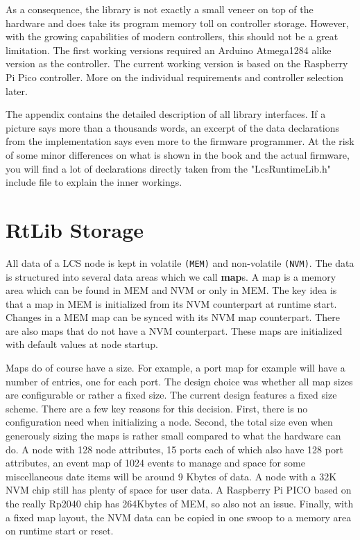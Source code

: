 As a consequence, the library is not exactly a small veneer on top of the hardware and does take its program memory toll on controller storage. However, with the growing capabilities of modern controllers, this should not be a great limitation. The first working versions required an Arduino Atmega1284 alike version as the controller. The current working version is based on the Raspberry Pi Pico controller. More on the individual requirements and controller selection later.

The appendix contains the detailed description of all library interfaces. If a picture says more than a thousands words, an excerpt of the data declarations from the implementation says even more to the firmware programmer. At the risk of some minor differences on what is shown in the book and the actual firmware, you will find a lot of declarations directly taken from the "LcsRuntimeLib.h" include file to explain the inner workings.

\section{RtLib Storage}

All data of a LCS node is kept in volatile \texttt{(MEM)} and non-volatile \texttt{(NVM)}. The data is structured into several data areas which we call \textbf{map}s. A map is a memory area which can be found in MEM and NVM or only in MEM. The key idea is that a map in MEM is initialized from its NVM counterpart at runtime start. Changes in a MEM map can be synced with its NVM map counterpart. There are also maps that do not have a NVM counterpart. These maps are initialized with default values at node startup. 

Maps do of course have a size. For example, a port map for example will have a number of entries, one for each port. The design choice was whether all map sizes are configurable or rather a fixed size. The current design features a fixed size scheme. There are a few key reasons for this decision. First, there is no configuration need when initializing a node. Second, the total size even when generously sizing the maps is rather small compared to what the hardware can do. A node with 128 node attributes, 15 ports each of which also have 128 port attributes, an event map of 1024 events to manage and space for some miscellaneous date items will be around 9 Kbytes of data. A node with a 32K NVM chip still has plenty of space for user data. A Raspberry Pi PICO based on the really Rp2040 chip has 264Kbytes of MEM, so also not an issue. Finally, with a fixed map layout, the NVM data can be copied in one swoop to a memory area on runtime start or reset. 

